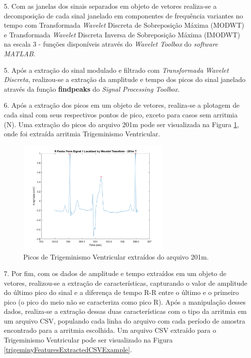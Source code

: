 \documentclass[conference]{IEEEtran}
\begin{document}
5. Com as janelas dos sinais separados em objeto de vetores realiza-se a decomposição de cada sinal janelado em componentes de frequência variantes no tempo com Transformada \textit{Wavelet} Discreta de Sobreposição Máxima (MODWT) e Transformada \textit{Wavelet} Discreta Inversa de Sobreposição Máxima (IMODWT) na escala 3 - funções disponíveis através do \textit{Wavelet Toolbox} do \textit{software MATLAB}.

5. Após a extração do sinal modulado e filtrado com \textit{Transformada Wavelet Discreta}, realizou-se a extração da amplitude e tempo dos picos do sinal janelado através da função \textbf{findpeaks} do \textit{Signal Processing Toolbox}.

6. Após a extração dos picos em um objeto de vetores, realiza-se a plotagem de cada sinal com seus respectivos pontos de pico, exceto para casos sem arritmia (N). Uma extração do picos do arquivo 201m pode ser visualizada na Figura \ref{signalPeaksExtractedTrigeminy}, onde foi extraída arritmia Trigeminismo Ventricular.

\begin{figure}[!h]
	\centering
	\includegraphics[width=3in]{img/signalPeaksExtractedTrigeminy}
	\caption{Picos de Trigeminismo Ventricular extraídos do arquivo 201m.}
	\label{signalPeaksExtractedTrigeminy}
\end{figure}

7. Por fim, com os dados de amplitude e tempo extraídos em um objeto de vetores, realizou-se a extração de características, capturando o valor de amplitude do último pico do sinal e a diferença de tempo R-R entre o último e o primeiro pico (o pico do meio não se caracteriza como pico R). Após a manipulação desses dados, realiza-se a extração dessas duas características com o tipo da arritmia em um arquivo CSV, populando cada linha do arquivo com cada período de amostra encontrado para a arritmia escolhida. Um arquivo CSV extraído para o Trigeminismo Ventricular pode ser visualizado na Figura \ref{trigeminyFeaturesExtractedCSVExample}.
\end{document}
